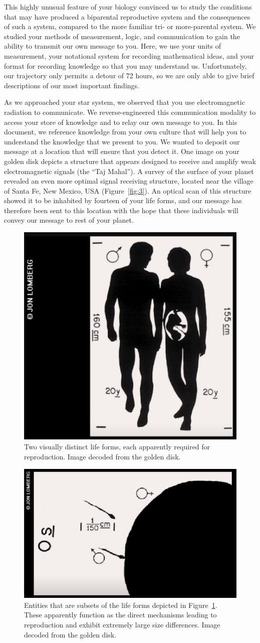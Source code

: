 This highly unusual feature of your biology convinced us to study the conditions that may have produced a biparental reproductive system and the consequences of such a system, compared to the more familiar tri- or more-parental system. We studied your methods of measurement, logic, and communication to gain the ability to transmit our own message to you. Here, we use your units of measurement, your notational system for recording mathematical ideas, and your format for recording knowledge so that you may understand us. Unfortunately, our trajectory only permits a detour of 72 hours, so we are only able to give brief descriptions of our most important findings. 

As we approached your star system, we observed that you use electromagnetic radiation to communicate. We reverse-engineered this communication modality to access your store of knowledge and to relay our own message to you. In this document, we reference knowledge from your own culture that will help you to understand the knowledge that we present to you. We wanted to deposit our message at a location that will ensure that you detect it. One image on your golden disk depicts a structure that appears designed to receive and amplify weak electromagnetic signals (the ``Taj Mahal''). A survey of the surface of your planet revealed an even more optimal signal receiving structure, located near the village of Santa Fe, New Mexico, USA (Figure~\ref{fig:3}). An optical scan of this structure showed it to be inhabited by fourteen of your life forms, and our message has therefore been sent to this location with the hope that these individuals will convey our message to rest of your planet. 

\begin{figure}
\centering
\includegraphics[width=0.3\columnwidth]{parents_voyager.jpg}
\caption{Two visually distinct life forms, each apparently required for reproduction. Image decoded from the golden disk.
\label{fig:1}}
\end{figure}

\begin{figure}
\centering
\includegraphics[width=0.3\columnwidth]{spermandegg_voyager.jpg}
\caption{Entities that are subsets of the life forms depicted in Figure~\ref{fig:1}. These apparently function as the direct mechanisms leading to reproduction and exhibit extremely large size differences. Image decoded from the golden disk.
\label{fig:2}}
\end{figure}

